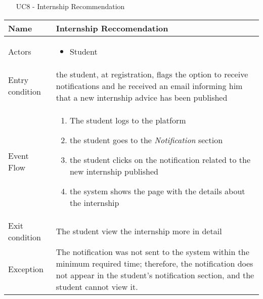 				
					
				
				\begin{table} [H]
					\centering
					\begin{itemize}
						\item [UC8] - Internship Recommendation
					\end{itemize}
					\begin{tabular}{|| P{7.5cm} | P{7.5cm} ||}
						\hline
						Name & Internship Reccomendation \\
						\hline
						Actors & \parbox{5cm}{\begin{itemize}
								\item Student
							\end{itemize}
						} \\
						\hline
						Entry condition & the student, at registration, flags the 
						option to receive notifications and he received an email informing him that a new internship advice has been published \\
						\hline
						Event Flow & \parbox{5cm}{\begin{enumerate}[label=\alpha]
								\item The student logs to the platform  
								\item the student goes to the \textit{Notification} 
								section
								\item  the student clicks on the notification 
								related to the new internship 
								published
								\item the system shows the page with the 
								details about the internship  
						\end{enumerate}} \\
						\hline 
						Exit condition & The student view the internship more in 
						detail \\
						\hline
						Exception & The notification was not sent to the system within the minimum required time; therefore, the notification does not appear in the student's notification section, and the student cannot view it. \\
						\hline
					\end{tabular}
				\end{table}
				
